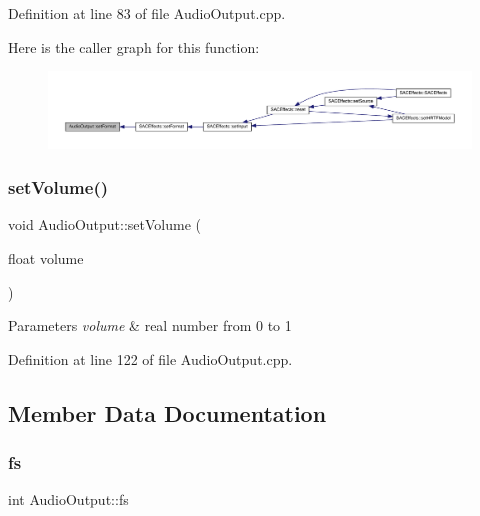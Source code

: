 Definition at line 83 of file Audio\+Output.\+cpp.

Here is the caller graph for this function\+:
\nopagebreak
\begin{figure}[H]
\begin{center}
\leavevmode
\includegraphics[width=350pt]{class_audio_output_a467f6e31cf89b89e9986caa05ec7fe62_icgraph}
\end{center}
\end{figure}
\mbox{\label{class_audio_output_a97008d6a17c3dc03c64e421f563e04b8}} 
\subsubsection{\texorpdfstring{set\+Volume()}{setVolume()}}
{\footnotesize\ttfamily void Audio\+Output\+::set\+Volume (\begin{DoxyParamCaption}\item[{float}]{volume }\end{DoxyParamCaption})}


\begin{DoxyParams}{Parameters}
{\em volume} & real number from 0 to 1 \\
\hline
\end{DoxyParams}


Definition at line 122 of file Audio\+Output.\+cpp.



\subsection{Member Data Documentation}
\mbox{\label{class_audio_output_ac2a46ded8a978627b8af81458a714ef3}} 
\subsubsection{\texorpdfstring{fs}{fs}}
{\footnotesize\ttfamily int Audio\+Output\+::fs}

